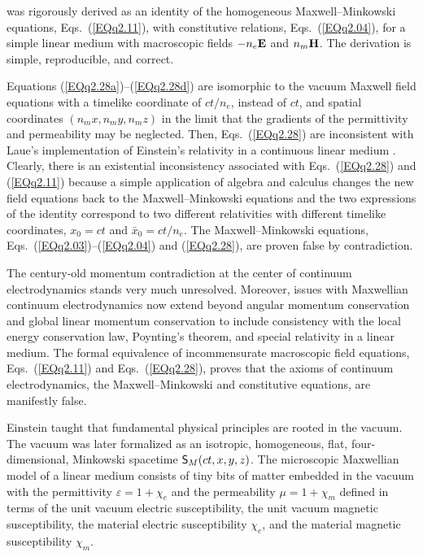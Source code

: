 \documentclass[twocolumn,amssymb,eqsecnum,aps,pra]{revtex4-2}
\begin{document}
was rigorously derived as an identity of the homogeneous
Maxwell--Minkowski equations, Eqs.~(\ref{EQq2.11}), with
constitutive relations, Eqs.~(\ref{EQq2.04}), for a simple
linear medium with macroscopic fields $-n_e{\bf E}$ and $n_m{\bf H}$.
The derivation \cite{BIIdentity} is simple, reproducible, and correct.
\par
Equations (\ref{EQq2.28a})--(\ref{EQq2.28d}) are isomorphic to the
vacuum Maxwell field equations with a timelike coordinate of $ct/n_e$,
instead of $ct$, and spatial coordinates $(n_mx,n_my,n_mz)$ in the
limit that the gradients of the permittivity and permeability may
be neglected.
Then, Eqs.~(\ref{EQq2.28}) are inconsistent with Laue's implementation
of Einstein's relativity in a continuous linear medium \cite{BILaue}.
Clearly, there is an existential inconsistency associated with
Eqs.~(\ref{EQq2.28}) and (\ref{EQq2.11}) because a simple
application of algebra and calculus changes the new field equations
back to the Maxwell--Minkowski equations and the two expressions
of the identity correspond to two different relativities
with different timelike coordinates, $x_0=ct$ and $\bar x_0=ct/n_e$.
The Maxwell--Minkowski equations, Eqs.~(\ref{EQq2.03})--(\ref{EQq2.04})
and (\ref{EQq2.28}), are proven false by contradiction.
\par
The century-old momentum contradiction at the center of continuum
electrodynamics stands very much unresolved.
Moreover, issues with Maxwellian continuum electrodynamics now
extend beyond angular momentum conservation and global linear
momentum conservation to include consistency with the local
energy conservation law, Poynting's theorem, and
special relativity in a linear medium.
The formal equivalence of incommensurate macroscopic field equations,
Eqs.~(\ref{EQq2.11}) and Eqs.~(\ref{EQq2.28}), proves that the axioms
of continuum electrodynamics, the Maxwell--Minkowski and constitutive
equations, are manifestly false.
\par
Einstein taught that fundamental physical principles are rooted in 
the vacuum.
The vacuum was later formalized as an isotropic, homogeneous, flat,
four-dimensional, Minkowski spacetime ${\sf S}_M(ct,x,y,z)$.
The microscopic Maxwellian model of a linear medium consists of
tiny bits of matter embedded in the vacuum with the permittivity
$\varepsilon=1+\chi_e$ and the permeability $\mu=1+\chi_m$ defined
in terms of the unit vacuum electric susceptibility,
the unit vacuum magnetic susceptibility,
the material electric susceptibility $\chi_e$,
and the material magnetic susceptibility $\chi_m$.
\end{document}
